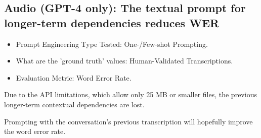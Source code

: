 \newpage
\subsection{Audio (GPT-4 only): The textual prompt for longer-term dependencies reduces WER}

\begin{itemize}
    \item Prompt Engineering Type Tested: One-/Few-shot Prompting.
    \item What are the 'ground truth' values: Human-Validated Transcriptions.
    \item Evaluation Metric: Word Error Rate.
\end{itemize}
Due to the API limitations, which allow only 25 MB or smaller files, the previous longer-term contextual dependencies are lost. 



Prompting with the conversation's previous transcription will hopefully improve the word error rate. 

